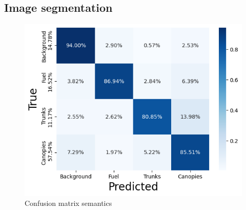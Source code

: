 \subsection{Image segmentation}
\begin{figure}
    \centering
    \includegraphics[width=\textwidth]{figs/results/confusion_matrix.png}
    \caption{Confusion matrix semantics}
    \label{fig:res_confusion_matrix}
\end{figure}
